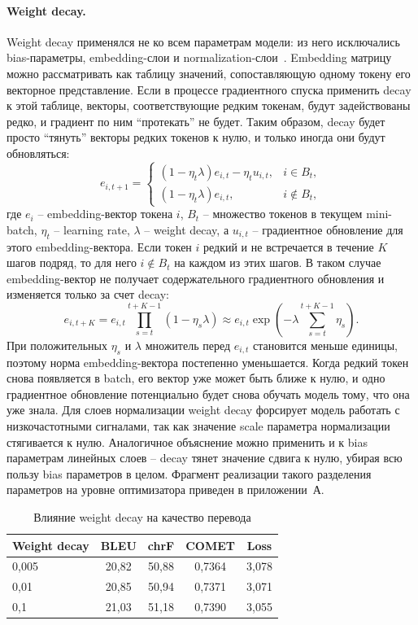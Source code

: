\paragraph{Weight decay.}
Weight decay применялся не ко всем параметрам модели: из него исключались bias-параметры, embedding-слои и normalization-слои~\cite{l2_normalization_decay}.
Embedding матрицу можно рассматривать как таблицу значений, сопоставляющую одному токену его векторное представление.
Если в процессе градиентного спуска применить decay к этой таблице, векторы, соответствующие редким токенам, будут задействованы редко, и градиент по ним ``протекать'' не будет. Таким образом, decay будет просто ``тянуть'' векторы редких токенов к нулю, и только иногда они будут обновляться:
\[
	e_{i,t+1} =
	\begin{cases}
		(1 - \eta_t \lambda)e_{i,t} - \eta_t u_{i,t}, & i \in B_t,    \\
		(1 - \eta_t \lambda)e_{i,t},                  & i \notin B_t,
	\end{cases}
\]
где $e_i$ -- embedding-вектор токена $i$, $B_t$ -- множество токенов в текущем mini-batch, $\eta_t$ -- learning rate, $\lambda$ -- weight decay, а $u_{i,t}$ -- градиентное обновление для этого embedding-вектора.
Если токен $i$ редкий и не встречается в течение $K$ шагов подряд, то для него $i \notin B_t$ на каждом из этих шагов. В таком случае embedding-вектор не получает содержательного градиентного обновления и изменяется только за счет decay:
\[
	e_{i,t+K}
	= e_{i,t}\prod_{s=t}^{t+K-1}(1 - \eta_s\lambda)
	\approx e_{i,t}\exp\left(-\lambda\sum_{s=t}^{t+K-1}\eta_s\right).
\]
При положительных $\eta_s$ и $\lambda$ множитель перед $e_{i,t}$ становится меньше единицы, поэтому норма embedding-вектора постепенно уменьшается. Когда редкий токен снова появляется в batch, его вектор уже может быть ближе к нулю, и одно градиентное обновление потенциально будет снова обучать модель тому, что она уже знала.
Для слоев нормализации weight decay форсирует модель работать с низкочастотными сигналами, так как значение scale параметра нормализации стягивается к нулю. Аналогичное объяснение можно применить и к bias параметрам линейных слоев -- decay тянет значение сдвига к нулю, убирая всю пользу bias параметров в целом.
Фрагмент реализации такого разделения параметров на уровне оптимизатора приведен в приложении~А.

\begin{table}[H]
	\centering
	\caption{Влияние weight decay на качество перевода}
	\label{tab:weight-decay-comparison}
	\begin{tabular}{|p{}|c|c|c|c|}
		\hline
		\textbf{Weight decay} & \textbf{BLEU} & \textbf{chrF} & \textbf{COMET} & \textbf{Loss} \\
		\hline
		0{,}005               & 20{,}82       & 50{,}88       & 0{,}7364       & 3{,}078       \\
		\hline
		0{,}01                & 20{,}85       & 50{,}94       & 0{,}7371       & 3{,}071       \\
		\hline
		0{,}1                 & 21{,}03       & 51{,}18       & 0{,}7390       & 3{,}055       \\
		\hline
	\end{tabular}
\end{table}

